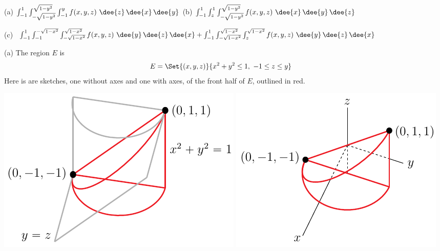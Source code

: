 %

\begin{answer}
(a) $\int_{-1}^1\int_{-\sqrt{1-y^2}}^{\sqrt{1-y^2}}
        \int_{-1}^y f(x,y,z)\ \dee{z}\,\dee{x}\,\dee{y} $\qquad
(b) $\int_{-1}^1\int_z^1 \int_{-\sqrt{1-y^2}}^{\sqrt{1-y^2}}
              f(x,y,z)\ \dee{x}\,\dee{y}\,\dee{z}$

(c) $\int_{-1}^1 \int_{-1}^{-\sqrt{1-x^2}} \int_{-\sqrt{1-x^2}}^{\sqrt{1-x^2}}
              f(x,y,z)\ \dee{y}\,\dee{z}\,\dee{x}
       +\int_{-1}^1 \int_{-\sqrt{1-x^2}}^{\sqrt{1-x^2}}
                    \int_z^{\sqrt{1-x^2}}  f(x,y,z)\ \dee{y}\,\dee{z}\,\dee{x}$
\end{answer}

\begin{solution}
(a)
The region $E$ is
\begin{align*}
E &= \Set{(x,y,z)}{x^2+y^2\le 1,\ -1\le z\le y} 
\end{align*}
Here is are sketches, one without axes and one with axes, 
of the front half of $E$, outlined in red.

\begin{center}
\includegraphics{fig/OE15D_7A.pdf}\quad
\includegraphics{fig/OE15D_7AA.pdf}
\end{center}


\end{solution}
